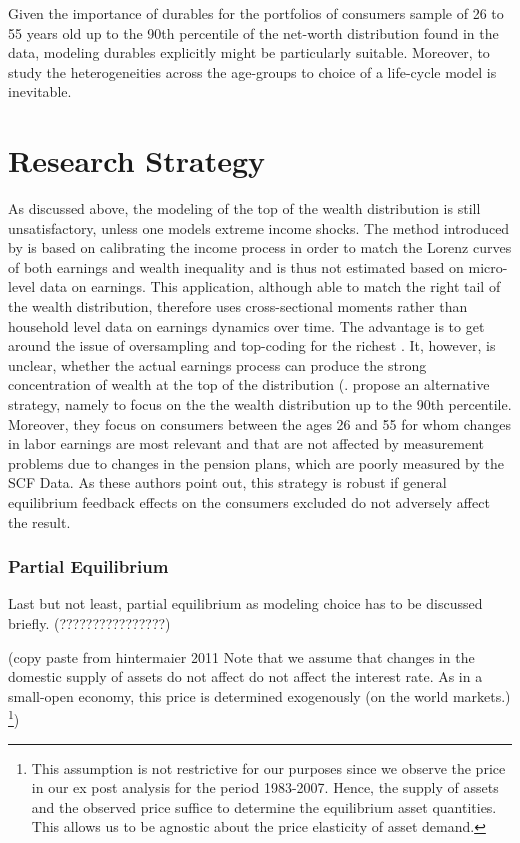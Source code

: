 \documentclass[a4paper,12pt,legno]{article}
\begin{document}
Given the importance of durables for the portfolios of consumers sample of 26 to 55 years old up to the 90th percentile of the net-worth distribution found in the data, modeling durables explicitly might be particularly suitable. Moreover, to study the heterogeneities across the age-groups to choice of a life-cycle model is inevitable. 


\section{Research Strategy}
As discussed above, the modeling of the top of the wealth distribution is still unsatisfactory, unless one models extreme income shocks. The method introduced by \cite{castaneda2003} is based on calibrating the income process in order to match the Lorenz curves of both earnings and wealth inequality and is thus not estimated based on micro-level data on earnings. This application, although able to match the right tail of the wealth distribution, therefore uses cross-sectional moments rather than household level data on earnings dynamics over time. The advantage is to get around the issue of oversampling and top-coding for the richest \citep{heathcote2009quantitative}. It, however, is unclear, whether the actual earnings process can produce the strong concentration of wealth at the top of the distribution (\cite{denardi2017}. \cite{hintermaier2011} propose an alternative strategy, namely to focus on the the wealth distribution up to the 90th percentile. Moreover, they focus on consumers between the ages 26 and 55 for whom changes in labor earnings are most relevant  and that are not affected by measurement problems due to changes in the pension plans, which are poorly measured by the SCF Data. As these authors point out,  this strategy is robust if general equilibrium feedback effects on the consumers excluded do not adversely affect the result. 

\subsubsection{Partial Equilibrium}
Last but not least, partial equilibrium as modeling choice has to be discussed briefly. (????????????????)

(copy paste from hintermaier 2011
Note that we assume that changes in the domestic supply of assets do not affect do not affect the interest rate. As in a small-open economy, this price is determined exogenously (on the world markets.) \footnote{This assumption is not restrictive for our purposes since we observe the price in our ex post analysis for the period 1983-2007. Hence, the supply of assets and the observed price suffice to determine the equilibrium asset quantities. This allows us to be agnostic about the price elasticity of asset demand.})
\end{document}
